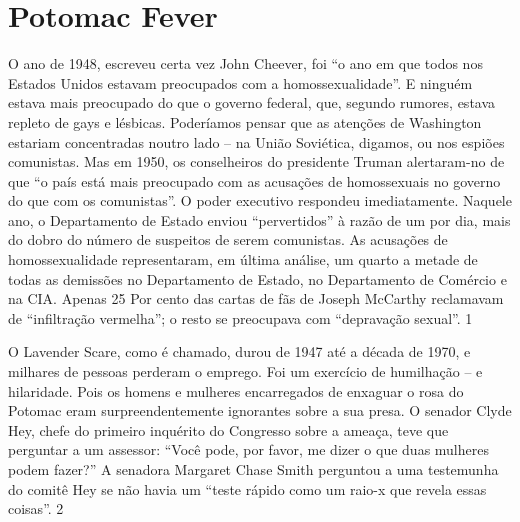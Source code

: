  
 \chapter{Potomac Fever}  

 \label{Potomac Fever}  
 
 
\par
 
 
 \textit{	}  

 
\par
 
 
 
\par
 

 \textbf{\textit{	} }  

 
\par
 
O ano de 1948, escreveu certa vez John Cheever, foi “o ano em que todos nos Estados Unidos estavam preocupados com a homossexualidade”. E ninguém estava mais preocupado do que o governo federal, que, segundo rumores, estava repleto de gays e lésbicas. Poderíamos pensar que as atenções de Washington estariam concentradas noutro lado – na União Soviética, digamos, ou nos espiões comunistas. Mas em 1950, os conselheiros do presidente Truman alertaram-no de que “o país está mais preocupado com as acusações de homossexuais no governo do que com os comunistas”. O poder executivo respondeu imediatamente. Naquele ano, o Departamento de Estado enviou “pervertidos” à razão de um por dia, mais do dobro do número de suspeitos de serem comunistas. As acusações de homossexualidade representaram, em última análise, um quarto a metade de todas as demissões no Departamento de Estado, no Departamento de Comércio e na CIA. Apenas
 {\color{blue} 25}  
Por cento das cartas de fãs de Joseph McCarthy reclamavam de “infiltração vermelha”; o resto se preocupava com “depravação sexual”.
 {\color{blue} 1}  

 
\par
 
O Lavender Scare, como é chamado, durou de 1947 até a década de 1970, e milhares de pessoas perderam o emprego. Foi um exercício de humilhação – e hilaridade. Pois os homens e mulheres encarregados de enxaguar o rosa do Potomac eram surpreendentemente ignorantes sobre a sua presa. O senador Clyde Hey, chefe do primeiro inquérito do Congresso sobre a ameaça, teve que perguntar a um assessor: “Você pode, por favor, me dizer o que duas mulheres podem fazer?” A senadora Margaret Chase Smith perguntou a uma testemunha do comitê Hey se não havia um “teste rápido como um raio-x que revela essas coisas”.
 {\color{blue} 2}  

